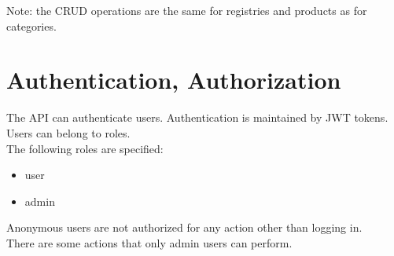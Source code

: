 \documentclass[11pt]{article}
\begin{document}
    Note: the CRUD operations are the same for registries and products as for categories.
    
    \section{Authentication, Authorization}
    The API can authenticate users.
    Authentication is maintained by JWT tokens.
    Users can belong to roles. \\
    The following roles are specified:
    \begin{itemize}
        \item user
        \item admin
    \end{itemize}
    Anonymous users are not authorized for any action other than logging in. \\
    There are some actions that only admin users can perform.
\end{document}

